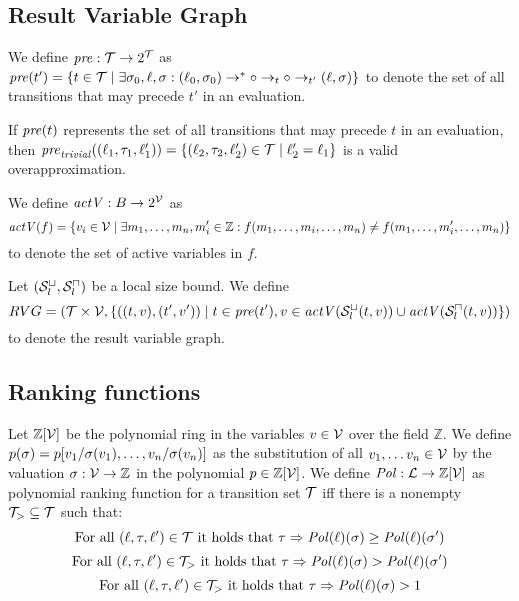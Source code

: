 \subsection{Result Variable Graph}

\begin{definition} 
	We define $\mathit{pre}: \mathcal{T} \rightarrow 2^{\mathcal{T}}$ as $\mathit{pre}(t') = \lbrace t \in \mathcal{T} \mid \exists \sigma_0, \ell, \sigma: (\ell_0, \sigma_0) \rightarrow^* \circ \rightarrow_t \circ \rightarrow_{t'} (\ell, \sigma) \rbrace$ to denote the set of all transitions that may precede $t'$ in an evaluation.	
\end{definition}

If $\mathit{pre}(t)$ represents the set of all transitions that may precede $t$ in an evaluation, then $\mathit{pre}_{\mathit{trivial}}((\ell_1, \tau_1, \ell_1')) = \lbrace (\ell_2, \tau_2, \ell_2') \in \mathcal{T} \mid \ell_2' = \ell_1 \rbrace$ is a valid overapproximation.

\begin{definition} 
	We define $\mathit{actV}: B \rightarrow 2^{\mathcal{V}}$ as 
	\[ \mathit{actV}(f) = \lbrace  v_i \in \mathcal{V} \mid \exists m_1, \dots, m_n, m_i' \in \mathbb{Z}: f(m_1, \dots, m_i, \dots, m_n) \neq f(m_1, \dots, m_i', \dots, m_n) \rbrace \]
	to denote the set of active variables in $f$.
\end{definition}

\begin{definition}
	Let ${({\mathcal{S}^\sqcup_l}, {\mathcal{S}^\sqcap_l})}$ be a local size bound.
	We define 
	\[ RVG = (\mathcal{T} \times \mathcal{V}, \lbrace ((t, v), (t', v')) \mid t \in \mathit{pre}(t'), v \in \mathit{actV}({\mathcal{S}^\sqcup_l}(t,v)) \cup \mathit{actV}({\mathcal{S}^\sqcap_l}(t,v)) \rbrace) \]
	to denote the result variable graph.
\end{definition}


\subsection{Ranking functions}

\begin{definition} 
	Let $\mathbb{Z}[\mathcal{V}]$ be the polynomial ring in the variables $v \in \mathcal{V}$ over the field $\mathbb{Z}$.
	We define $p(\sigma) = p[v_1/\sigma(v_1), \dots, v_n/\sigma(v_n)]$ as the substitution of all $v_1, \dots v_n \in \mathcal{V}$ by the valuation $\sigma: \mathcal{V} \rightarrow \mathbb{Z}$ in the polynomial $p \in \mathbb{Z}[\mathcal{V}]$.
	We define $\mathit{Pol}: \mathcal{L} \rightarrow \mathbb{Z}[\mathcal{V}]$ as polynomial ranking function for a transition set $\mathcal{T}$ iff there is a nonempty $\mathcal{T}_{>} \subseteq \mathcal{T}$ such that:
	\[ \text{For all } (\ell, \tau, \ell') \in \mathcal{T} \text{ it holds that } \tau \Rightarrow \mathit{Pol}(\ell)(\sigma) \geq \mathit{Pol}(\ell)(\sigma') \]
	\[ \text{For all } (\ell, \tau, \ell') \in \mathcal{T}_{>} \text{ it holds that } \tau \Rightarrow \mathit{Pol}(\ell)(\sigma) > \mathit{Pol}(\ell)(\sigma') \]
	\[ \text{For all } (\ell, \tau, \ell') \in \mathcal{T}_{>} \text{ it holds that } \tau \Rightarrow \mathit{Pol}(\ell)(\sigma) > 1 \]
\end{definition}


